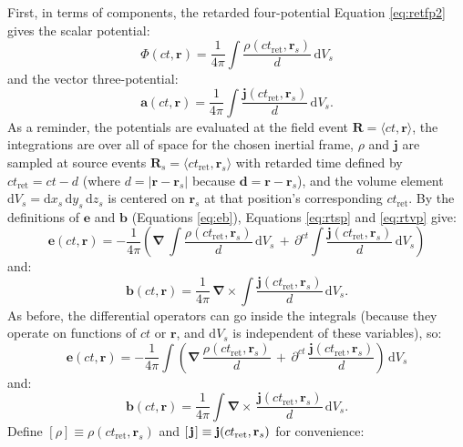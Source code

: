 \documentclass[12pt]{article}
\renewcommand{\vv}[1]{\mathbf{#1}}
\newcommand{\dd}[1]{\mathrm{d}#1}
\newcommand{\del}{\boldsymbol{\nabla}}
\begin{document}
First, in terms of components, the retarded four-potential Equation \ref{eq:retfp2} gives the scalar potential:
\begin{equation}\label{eq:rtsp}
\Phi(ct, \vv r) = \dfrac{1}{4 \pi} \int \dfrac{\rho (ct_{\textrm{ret}}, \vv r _{s})}{d} \, \dd V_{s}
\end{equation}
and the vector three-potential:
\begin{equation}\label{eq:rtvp}
\vv a(ct, \vv r) = \dfrac{1}{4 \pi} \int \dfrac{\vv j (ct_{\textrm{ret}}, \vv r _{s})}{d} \, \dd V_{s} .
\end{equation}
As a reminder, the potentials are evaluated at the field event ${\vv R = \langle ct, \vv r \rangle}$, the integrations are over all of space for the chosen inertial frame, $\rho$ and $\vv j$ are sampled at source events $\vv R_{s} = \langle ct_{\textrm{ret}}, \vv r_{s} \rangle $ with retarded time defined by $ct_{\textrm{ret}} = ct - d$ (where $d = \vert \vv r - \vv r_{s} \vert$ because $\vv d = \vv r - \vv r_{s}$), and the volume element $\dd V_{s} = \dd x_{s} \, \dd y_{s} \, \dd z_{s}$ is centered on $\vv r_{s}$ at that position's corresponding $ct_{\textrm{ret}}$. By the definitions of $\vv e$ and $\vv b$ (Equations \ref{eq:eb}), Equations \ref{eq:rtsp} and \ref{eq:rtvp} give:
\begin{equation*}
\vv e(ct, \vv r) = - \dfrac{1}{4 \pi} \left( \del \, \int \dfrac{\rho (ct_{\textrm{ret}}, \vv r _{s})}{d} \, \dd V_{s} \, + \, \partial^{ct} \int \dfrac{\vv j (ct_{\textrm{ret}}, \vv r _{s})}{d} \, \dd V_{s} \right) 
\end{equation*}
and:
\begin{equation*}
\vv b(ct, \vv r) = \dfrac{1}{4 \pi} \, \del \times \int \dfrac{\vv j (ct_{\textrm{ret}}, \vv r _{s})}{d} \, \dd V_{s} .
\end{equation*}
As before, the differential operators can go inside the integrals (because they operate on functions of $ct$ or $\vv r$, and $\dd V_{s}$ is independent of these variables), so:
\begin{equation*}
\vv e(ct, \vv r) = - \dfrac{1}{4 \pi} \int \left( \del \, \dfrac{\rho (ct_{\textrm{ret}}, \vv r _{s})}{d} \, + \, \partial^{ct} \, \dfrac{\vv j (ct_{\textrm{ret}}, \vv r _{s})}{d} \right) \, \dd V_{s}
\end{equation*}
and:
\begin{equation*}
\vv b(ct, \vv r) = \dfrac{1}{4 \pi} \int \del \times \, \dfrac{\vv j (ct_{\textrm{ret}}, \vv r _{s})}{d} \, \dd V_{s} .
\end{equation*}
Define $[ \rho ] \equiv \rho (ct_{\textrm{ret}}, \vv r _{s})$ and $[\mkern2mu \vv j \mkern1.5mu ] \equiv \vv j (ct_{\textrm{ret}}, \vv r _{s})$ for convenience:
\end{document}
